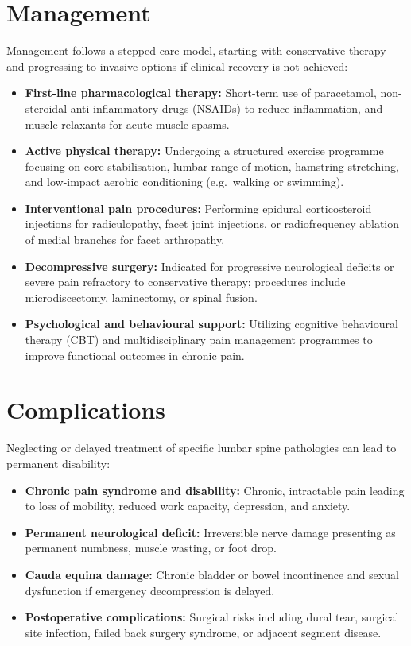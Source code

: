 \section*{Management}
Management follows a stepped care model, starting with conservative therapy and progressing to invasive options if clinical recovery is not achieved:

\begin{itemize}
    \item \textbf{First-line pharmacological therapy:} Short-term use of paracetamol, non-steroidal anti-inflammatory drugs (NSAIDs) to reduce inflammation, and muscle relaxants for acute muscle spasms.
    \item \textbf{Active physical therapy:} Undergoing a structured exercise programme focusing on core stabilisation, lumbar range of motion, hamstring stretching, and low-impact aerobic conditioning (e.g.\ walking or swimming).
    \item \textbf{Interventional pain procedures:} Performing epidural corticosteroid injections for radiculopathy, facet joint injections, or radiofrequency ablation of medial branches for facet arthropathy.
    \item \textbf{Decompressive surgery:} Indicated for progressive neurological deficits or severe pain refractory to conservative therapy; procedures include microdiscectomy, laminectomy, or spinal fusion.
    \item \textbf{Psychological and behavioural support:} Utilizing cognitive behavioural therapy (CBT) and multidisciplinary pain management programmes to improve functional outcomes in chronic pain.
\end{itemize}

\section*{Complications}
Neglecting or delayed treatment of specific lumbar spine pathologies can lead to permanent disability:

\begin{itemize}
    \item \textbf{Chronic pain syndrome and disability:} Chronic, intractable pain leading to loss of mobility, reduced work capacity, depression, and anxiety.
    \item \textbf{Permanent neurological deficit:} Irreversible nerve damage presenting as permanent numbness, muscle wasting, or foot drop.
    \item \textbf{Cauda equina damage:} Chronic bladder or bowel incontinence and sexual dysfunction if emergency decompression is delayed.
    \item \textbf{Postoperative complications:} Surgical risks including dural tear, surgical site infection, failed back surgery syndrome, or adjacent segment disease.
\end{itemize}

